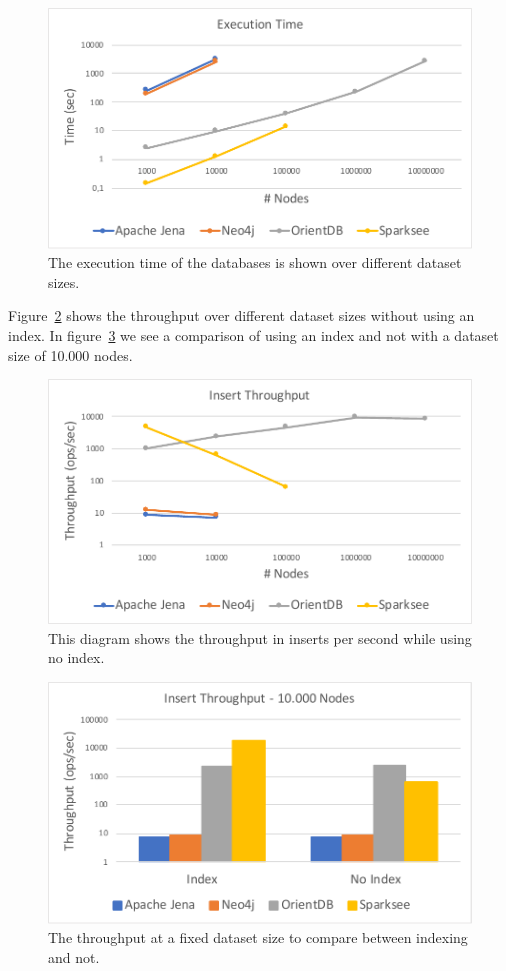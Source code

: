 \begin{figure}[h!]
  \centering
  \includegraphics[width=.75\textwidth]{images/throughput/withIndexExecutionTime}
  \caption{The execution time of the databases is shown over different dataset sizes.}
  \label{fig:withIndexExecutionTime}
\end{figure}

Figure~\ref{fig:withoutIndexThroughput} shows the throughput over different dataset sizes without using an index.
In figure~\ref{fig:withWithoutIndexThroughputFixNodes} we see a comparison of using an index and not with a dataset size of 10.000 nodes.

\begin{figure}[h!]
  \centering
  \includegraphics[width=.75\textwidth]{images/throughput/withoutIndexThroughput}
  \caption{This diagram shows the throughput in inserts per second while using no index.}
  \label{fig:withoutIndexThroughput}
\end{figure}

\begin{figure}[h!]
  \centering
  \includegraphics[width=.75\textwidth]{images/throughput/withWithoutIndexThroughputFixNodes}
  \caption{The throughput at a fixed dataset size to compare between indexing and not.}
  \label{fig:withWithoutIndexThroughputFixNodes}
\end{figure}

